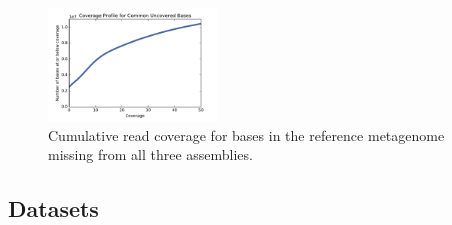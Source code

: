 \documentclass[10pt,a4paper,twocolumn]{article}
\begin{document}
\begin{figure}[!h]
\centering
\includegraphics[width=0.4\textwidth]{CommonUncoveredCoverageProfile.pdf} 
\caption{Cumulative read coverage for bases in the reference metagenome missing from all three assemblies.}
\label{fig:CommonUncovered}
\end{figure}







 

\subsection*{Datasets}
\end{document}
